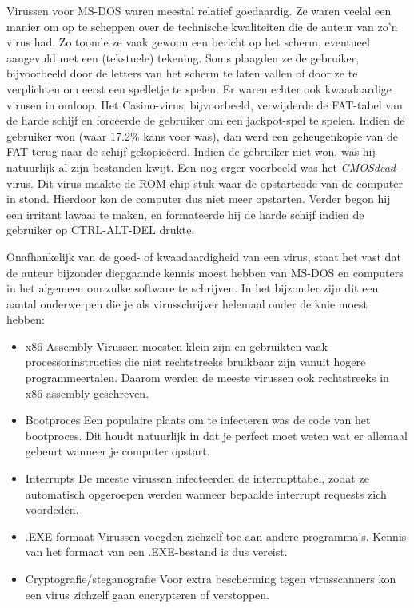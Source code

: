 Virussen voor MS-DOS waren meestal relatief goedaardig. Ze waren veelal een manier om op te scheppen over de technische kwaliteiten die de auteur van zo'n virus had. Zo toonde ze vaak gewoon een bericht op het scherm, eventueel aangevuld met een (tekstuele) tekening. Soms plaagden ze de gebruiker, bijvoorbeeld door de letters van het scherm te laten vallen of door ze te verplichten om eerst een spelletje te spelen. Er waren echter ook kwaadaardige virusen in omloop. Het Casino-virus, bijvoorbeeld, verwijderde de FAT-tabel van de harde schijf en forceerde de gebruiker om een jackpot-spel te spelen. Indien de gebruiker won (waar 17.2\% kans voor was), dan werd een geheugenkopie van de FAT terug naar de schijf gekopie\"eerd. Indien de gebruiker niet won, was hij natuurlijk al zijn bestanden kwijt. Een nog erger voorbeeld was het \emph{CMOSdead}-virus. Dit virus maakte de ROM-chip stuk waar de opstartcode van de computer in stond. Hierdoor kon de computer dus niet meer opstarten. Verder begon hij een irritant lawaai te maken, en formateerde hij de harde schijf indien de gebruiker op CTRL-ALT-DEL drukte.

Onafhankelijk van de goed- of kwaadaardigheid van een virus, staat het vast dat de auteur bijzonder diepgaande kennis moest hebben van MS-DOS en computers in het algemeen om zulke software te schrijven. In het bijzonder zijn dit een aantal onderwerpen die je als virusschrijver helemaal onder de knie moest hebben:

\begin{itemize}
\item{x86 Assembly} Virussen moesten klein zijn en gebruikten vaak processorinstructies die niet rechtstreeks bruikbaar zijn vanuit hogere programmeertalen. Daarom werden de meeste virussen ook rechtstreeks in x86 assembly geschreven.
\item{Bootproces} Een populaire plaats om te infecteren was de code van het bootproces. Dit houdt natuurlijk in dat je perfect moet weten wat er allemaal gebeurt wanneer je computer opstart.
\item{Interrupts} De meeste virussen infecteerden de interrupttabel, zodat ze automatisch opgeroepen werden wanneer bepaalde interrupt requests zich voordeden.
\item{.EXE-formaat} Virussen voegden zichzelf toe aan andere programma's. Kennis van het formaat van een .EXE-bestand is dus vereist.
\item{Cryptografie/steganografie} Voor extra bescherming tegen virusscanners kon een virus zichzelf gaan encrypteren of verstoppen.
\end{itemize}

